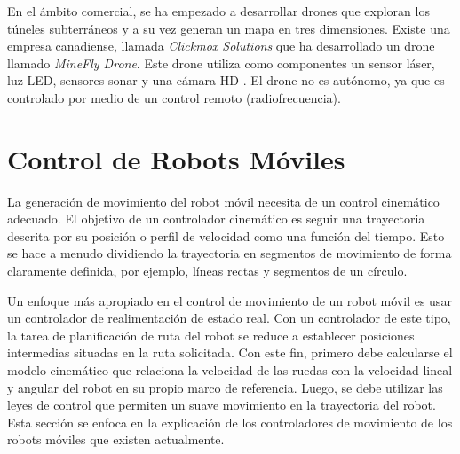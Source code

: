En el ámbito comercial, se ha empezado a desarrollar drones que exploran los túneles
subterráneos y a su vez generan un mapa en tres dimensiones. Existe una empresa canadiense,
llamada \textit{Clickmox Solutions} que ha desarrollado un drone llamado
\textit{MineFly Drone}. Este drone utiliza como componentes un sensor láser, luz LED,
sensores sonar y una cámara HD \cite{Solutions2016}. El drone no es autónomo, ya que es
controlado por medio de un control remoto (radiofrecuencia).


\section{Control de Robots Móviles}

La generación de movimiento del robot móvil necesita de un control cinemático 
adecuado. El objetivo de un controlador cinemático es seguir una trayectoria descrita 
por su posición o perfil de velocidad como una función del tiempo. Esto se hace 
a menudo dividiendo la trayectoria en segmentos de movimiento de forma claramente 
definida, por ejemplo, líneas rectas y segmentos de un círculo.

Un enfoque más apropiado en el control de movimiento de un robot móvil es usar 
un controlador de realimentación de estado real. Con un controlador de este tipo, 
la tarea de planificación de ruta del robot se reduce a establecer posiciones 
intermedias situadas en la ruta solicitada. Con este fin, primero debe calcularse 
el modelo cinemático que relaciona la velocidad de las ruedas con la velocidad 
lineal y angular del robot en su propio marco de referencia. Luego, se debe utilizar las 
leyes de control que permiten un suave movimiento en la trayectoria del robot. Esta
sección se enfoca en la explicación de los controladores de movimiento de 
los robots móviles que existen actualmente.

